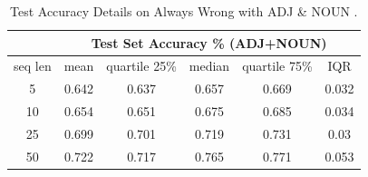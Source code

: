 \documentclass[12pt]{article}
\begin{document}
\begin{table}[!h]
\begin{tabular}{c|ccccc|}
\cline{2-6}
\multicolumn{1}{l|}{}         & \multicolumn{5}{c|}{Test Set Accuracy \% (ADJ+NOUN)}                                                                                       \\ \hline
\multicolumn{1}{|c|}{seq len} & \multicolumn{1}{c|}{mean}  & \multicolumn{1}{c|}{quartile 25\%} & \multicolumn{1}{c|}{median} & \multicolumn{1}{c|}{quartile 75\%} & IQR   \\ \hline
\multicolumn{1}{|c|}{5}       & \multicolumn{1}{c|}{0.642} & \multicolumn{1}{c|}{0.637}         & \multicolumn{1}{c|}{0.657}  & \multicolumn{1}{c|}{0.669}         & 0.032 \\ \hline
\multicolumn{1}{|c|}{10}      & \multicolumn{1}{c|}{0.654} & \multicolumn{1}{c|}{0.651}         & \multicolumn{1}{c|}{0.675}  & \multicolumn{1}{c|}{0.685}         & 0.034 \\ \hline
\multicolumn{1}{|c|}{25}      & \multicolumn{1}{c|}{0.699} & \multicolumn{1}{c|}{0.701}         & \multicolumn{1}{c|}{0.719}  & \multicolumn{1}{c|}{0.731}         & 0.03  \\ \hline
\multicolumn{1}{|c|}{50}      & \multicolumn{1}{c|}{0.722} & \multicolumn{1}{c|}{0.717}         & \multicolumn{1}{c|}{0.765}  & \multicolumn{1}{c|}{0.771}         & 0.053 \\ \hline
\end{tabular}
\caption{Test Accuracy Details on Always Wrong with ADJ & NOUN .}
\label{appendix:alwayswrongADJNOUN}
\end{table}
\end{document}
